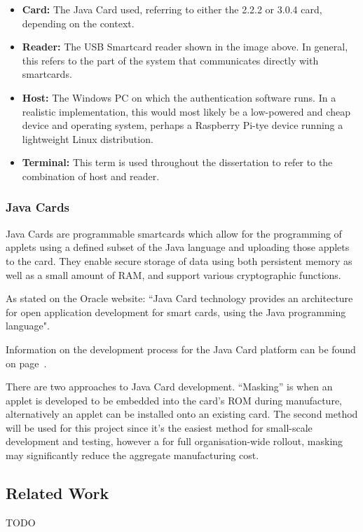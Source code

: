 \documentclass[12pt,a4paper]{article}
\begin{document}
\begin{itemize}
	\item \textbf{Card:} The Java Card used, referring to either the 2.2.2 or 3.0.4 card, depending on the context.
	
	\item \textbf{Reader:} The USB Smartcard reader shown in the image above. In general, this refers to the part of the system that communicates directly with smartcards.

	\item \textbf{Host:} The Windows PC on which the authentication software runs. In a realistic implementation, this would most likely be a low-powered and cheap device and operating system, perhaps a Raspberry Pi-tye device running a lightweight Linux distribution.
	
	\item \textbf{Terminal:} This term is used throughout the dissertation to refer to the combination of host and reader.
	
\end{itemize} 

\subsubsection{Java Cards}
Java Cards are programmable smartcards which allow for the programming of applets using a defined subset of the Java language and uploading those applets to the card. They enable secure storage of data using both persistent memory as well as a small amount of RAM, and support various cryptographic functions. 

As stated on the Oracle website: ``Java Card technology provides an architecture for open application development for smart cards, using the Java programming language".

Information on the development process for the Java Card platform can be found on page~\pageref{build_process}.

There are two approaches to Java Card development. “Masking” is when an applet is developed to be embedded into the card’s ROM during manufacture, alternatively an applet can be installed onto an existing card. The second method will be used for this project since it’s the easiest method for small-scale development and testing, however a for full organisation-wide rollout, masking may significantly reduce the aggregate manufacturing cost.



\subsection{Related Work}
TODO
\end{document}
